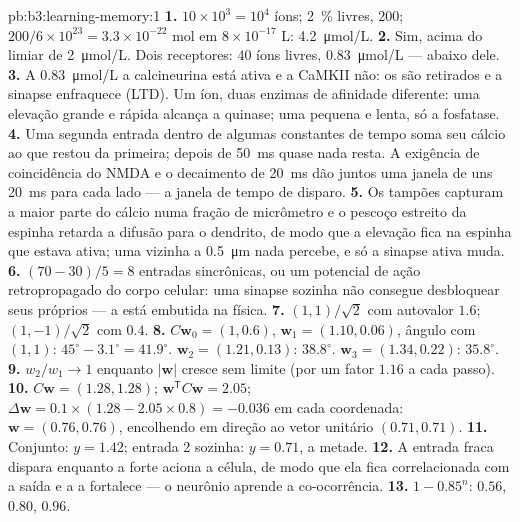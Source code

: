\begin{solution}{pb:b3:learning-memory:1}
\textbf{1.} $10\times 10^{3} = 10^{4}$ íons; \qty{2}{\%} livres, $200$;
$200/6\times 10^{23} = 3.3\times 10^{-22}$ mol em $8\times 10^{-17}$ L:
\qty{4.2}{\micro mol/L}.
\textbf{2.} Sim, acima do limiar de \qty{2}{\micro mol/L}. Dois
receptores: $40$ íons livres, \qty{0.83}{\micro mol/L} --- abaixo dele.
\textbf{3.} A \qty{0.83}{\micro mol/L} a calcineurina está ativa e a
CaMKII não: os  são retirados e a sinapse enfraquece
(LTD). Um íon, duas enzimas de afinidade diferente: uma elevação grande e
rápida alcança a quinase; uma pequena e lenta, só a fosfatase.
\textbf{4.} Uma segunda entrada dentro de algumas constantes de tempo
soma seu cálcio ao que restou da primeira; depois de \qty{50}{ms} quase
nada resta. A exigência de coincidência do NMDA e o decaimento de
\qty{20}{ms} dão juntos uma janela de uns \qty{20}{ms} para cada lado ---
a janela de tempo de disparo.
\textbf{5.} Os tampões capturam a maior parte do cálcio numa fração de
micrômetro e o pescoço estreito da espinha retarda a difusão para o
dendrito, de modo que a elevação fica na espinha que estava ativa; uma
vizinha a \qty{0.5}{\micro m} nada percebe, e só a sinapse ativa muda.
\textbf{6.} $(70 - 30)/5 = 8$ entradas sincrônicas, ou um potencial de
ação retropropagado do corpo celular: uma sinapse sozinha não consegue
desbloquear seus próprios  --- a  está
embutida na física.
\textbf{7.} $(1,1)/\sqrt{2}$ com autovalor $1.6$; $(1,-1)/\sqrt{2}$ com
$0.4$.
\textbf{8.} $C\mathbf{w}_{0} = (1, 0.6)$, $\mathbf{w}_{1} = (1.10,
0.06)$, ângulo com $(1,1)$: $45^{\circ} - 3.1^{\circ} = 41.9^{\circ}$.
$\mathbf{w}_{2} = (1.21, 0.13)$: $38.8^{\circ}$. $\mathbf{w}_{3} = (1.34,
0.22)$: $35.8^{\circ}$.
\textbf{9.} $w_{2}/w_{1} \to 1$ enquanto $|\mathbf{w}|$ cresce sem limite
(por um fator $1.16$ a cada passo).
\textbf{10.} $C\mathbf{w} = (1.28, 1.28)$; $\mathbf{w}^{\mathsf{T}}C
\mathbf{w} = 2.05$; $\Delta\mathbf{w} = 0.1\times(1.28 - 2.05\times 0.8)
= -0.036$ em cada coordenada: $\mathbf{w} = (0.76, 0.76)$, encolhendo em
direção ao vetor unitário $(0.71, 0.71)$.
\textbf{11.} Conjunto: $y = 1.42$; entrada 2 sozinha: $y = 0.71$, a
metade.
\textbf{12.} A entrada fraca dispara enquanto a forte aciona a célula, de
modo que ela fica correlacionada com a saída e a  a
fortalece --- o neurônio aprende a co-ocorrência.
\textbf{13.} $1 - 0.85^{n}$: $0.56$, $0.80$, $0.96$.

\end{solution}
